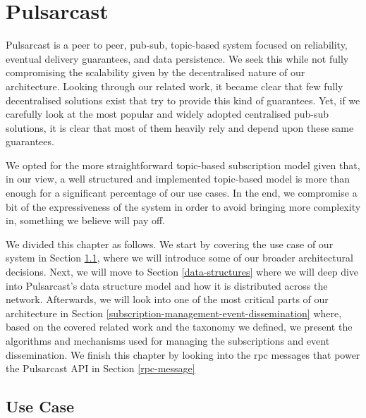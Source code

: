 
\chapter{Pulsarcast}
\label{chapter:pulsarcast}

Pulsarcast is a peer to peer, pub-sub, topic-based system focused on
reliability, eventual delivery guarantees, and data persistence. We seek this
while not fully compromising the scalability given by the decentralised nature
of our architecture. Looking through our related work, it became clear that few
fully decentralised solutions exist that try to provide this kind of
guarantees. Yet, if we carefully look at the most popular and widely adopted
centralised pub-sub solutions, it is clear that most of them heavily rely and
depend upon these same guarantees. 

We opted for the more straightforward topic-based subscription model given
that, in our view, a well structured and implemented topic-based model is more
than enough for a significant percentage of our use cases. In the end, we
compromise a bit of the expressiveness of the system in order to avoid bringing
more complexity in, something we believe will pay off.

We divided this chapter as follows. We start by covering the use case of our
system in Section \ref{use-case}, where we will introduce some of our broader
architectural decisions. Next, we will move to Section \ref{data-structures}
where we will deep dive into Pulsarcast's data structure model and how it is
distributed across the network. Afterwards, we will look into one of the most
critical parts of our architecture in Section
\ref{subscription-management-event-dissemination} where, based on the covered
related work and the taxonomy we defined, we present the algorithms and
mechanisms used for managing the subscriptions and event dissemination. We
finish this chapter by looking into the \acrshort{rpc} messages that power the
Pulsarcast API in Section \ref{rpc-message}

\section{Use Case}\label{use-case}

